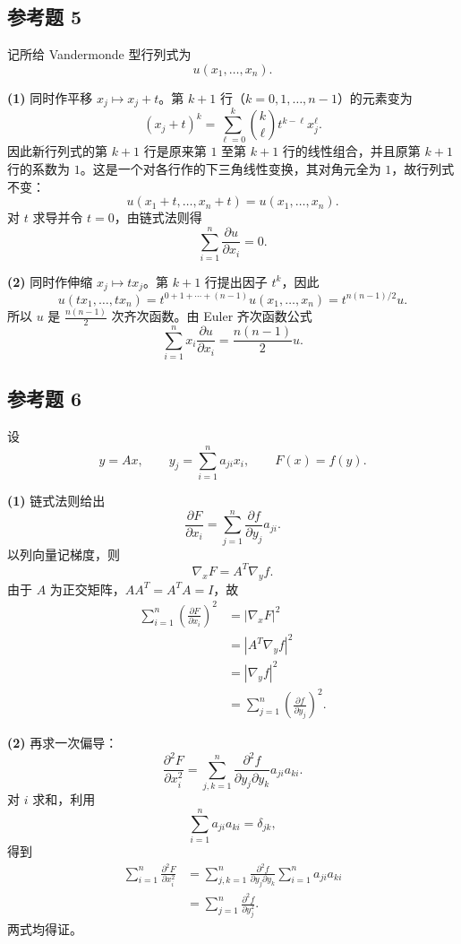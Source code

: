 \subsection*{参考题 5}
\begin{xsolution}
记所给 Vandermonde 型行列式为
\[
  u(x_1,\ldots,x_n).
\]

\textbf{(1)} 同时作平移 $x_j\mapsto x_j+t$。第 $k+1$ 行（$k=0,1,\ldots,n-1$）的元素变为
\[
  (x_j+t)^k
  =\sum_{\ell=0}^k\binom{k}{\ell}t^{k-\ell}x_j^\ell.
\]
因此新行列式的第 $k+1$ 行是原来第 $1$ 至第 $k+1$ 行的线性组合，并且原第 $k+1$ 行的系数为 $1$。这是一个对各行作的下三角线性变换，其对角元全为 $1$，故行列式不变：
\[
  u(x_1+t,\ldots,x_n+t)=u(x_1,\ldots,x_n).
\]
对 $t$ 求导并令 $t=0$，由链式法则得
\[
  \boxed{\sum_{i=1}^n\frac{\partial u}{\partial x_i}=0}.
\]

\textbf{(2)} 同时作伸缩 $x_j\mapsto t x_j$。第 $k+1$ 行提出因子 $t^k$，因此
\[
  u(tx_1,\ldots,tx_n)
  =t^{0+1+\cdots+(n-1)}u(x_1,\ldots,x_n)
  =t^{n(n-1)/2}u.
\]
所以 $u$ 是 $\frac{n(n-1)}2$ 次齐次函数。由 Euler 齐次函数公式
\[
  \boxed{
  \sum_{i=1}^n x_i\frac{\partial u}{\partial x_i}
  =\frac{n(n-1)}2u}.
\]
\end{xsolution}

\subsection*{参考题 6}
\begin{xsolution}
设
\[
  y=Ax,
  \qquad y_j=\sum_{i=1}^n a_{ji}x_i,
  \qquad F(x)=f(y).
\]

\textbf{(1)} 链式法则给出
\[
  \frac{\partial F}{\partial x_i}
  =\sum_{j=1}^n\frac{\partial f}{\partial y_j}a_{ji}.
\]
以列向量记梯度，则
\[
  \nabla_xF=A^T\nabla_yf.
\]
由于 $A$ 为正交矩阵，$AA^T=A^TA=I$，故
\begin{align*}
  \sum_{i=1}^n\left(\frac{\partial F}{\partial x_i}\right)^2
  &=|\nabla_xF|^2\\
  &=|A^T\nabla_yf|^2\\
  &=|\nabla_yf|^2\\
  &=\sum_{j=1}^n\left(\frac{\partial f}{\partial y_j}\right)^2.
\end{align*}

\textbf{(2)} 再求一次偏导：
\[
  \frac{\partial^2F}{\partial x_i^2}
  =\sum_{j,k=1}^n
  \frac{\partial^2f}{\partial y_j\partial y_k}a_{ji}a_{ki}.
\]
对 $i$ 求和，利用
\[
  \sum_{i=1}^n a_{ji}a_{ki}=\delta_{jk},
\]
得到
\begin{align*}
  \sum_{i=1}^n\frac{\partial^2F}{\partial x_i^2}
  &=\sum_{j,k=1}^n
    \frac{\partial^2f}{\partial y_j\partial y_k}
    \sum_{i=1}^n a_{ji}a_{ki}\\
  &=\sum_{j=1}^n\frac{\partial^2f}{\partial y_j^2}.
\end{align*}
两式均得证。
\end{xsolution}

